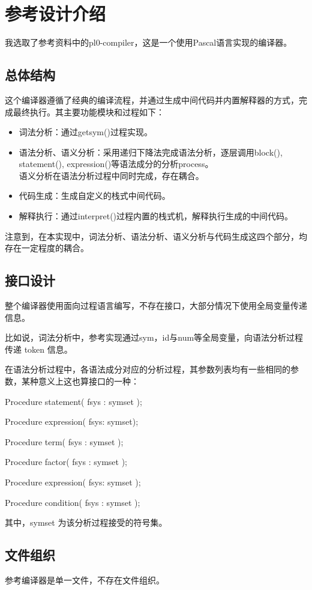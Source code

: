 \section{参考设计介绍}

我选取了参考资料中的pl0-compiler，这是一个使用Pascal语言实现的编译器。

\subsection{总体结构}

这个编译器遵循了经典的编译流程，并通过生成中间代码并内置解释器的方式，完成最终执行。其主要功能模块和过程如下：

\begin{itemize}
    \item 词法分析：通过getsym()过程实现。
    \item 语法分析、语义分析：采用递归下降法完成语法分析，逐层调用block(), statement(), expression()等语法成分的分析process。\\语义分析在语法分析过程中同时完成，存在耦合。
    \item 代码生成：生成自定义的栈式中间代码。
    \item 解释执行：通过interpret()过程内置的栈式机，解释执行生成的中间代码。
\end{itemize}


注意到，在本实现中，词法分析、语法分析、语义分析与代码生成这四个部分，均存在一定程度的耦合。

\subsection{接口设计}


整个编译器使用面向过程语言编写，不存在接口，大部分情况下使用全局变量传递信息。

比如说，词法分析中，参考实现通过sym，id与num等全局变量，向语法分析过程传递 token 信息。

在语法分析过程中，各语法成分对应的分析过程，其参数列表均有一些相同的参数，某种意义上这也算接口的一种：

Procedure statement( fsys : symset );

Procedure expression( fsys: symset);

Procedure term( fsys : symset );

Procedure factor( fsys : symset );

Procedure expression( fsys: symset );

Procedure condition( fsys : symset );


其中，symset 为该分析过程接受的符号集。

\subsection{文件组织}

参考编译器是单一文件，不存在文件组织。